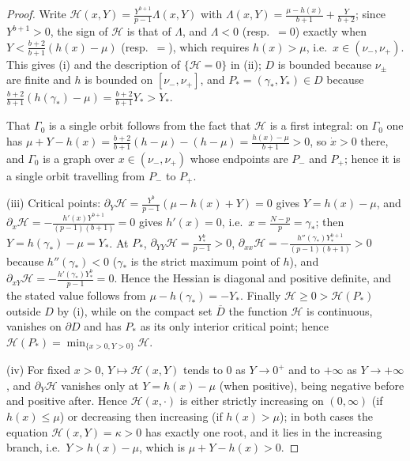 \documentclass[11pt,reqno]{amsart}
\numberwithin{equation}{section}
\theoremstyle{plain}
\theoremstyle{definition}
\newcommand{\gs}{\gamma_{*}}
\begin{document}
\begin{proof}
Write $\mathcal H(x,Y)=\frac{Y^{b+1}}{p-1}\Lambda(x,Y)$ with
$\Lambda(x,Y)=\frac{\mu-h(x)}{b+1}+\frac{Y}{b+2}$; since $Y^{b+1}>0$, the sign
of $\mathcal H$ is that of $\Lambda$, and $\Lambda<0$ (resp.\ $=0$) exactly when
$Y<\frac{b+2}{b+1}(h(x)-\mu)$ (resp.\ $=$), which requires $h(x)>\mu$, i.e.\
$x\in(\nu_{-},\nu_{+})$. This gives (i) and the description of
$\{\mathcal H=0\}$ in (ii); $D$ is bounded because $\nu_{\pm}$ are finite and
$h$ is bounded on $[\nu_{-},\nu_{+}]$, and $P_{*}=(\gs,Y_{*})\in D$ because
$\frac{b+2}{b+1}(h(\gs)-\mu)=\frac{b+2}{b+1}Y_{*}>Y_{*}$.

That $\Gamma_{0}$ is a single orbit follows from the fact that $\mathcal H$ is a
first integral: on $\Gamma_{0}$ one has
$\mu+Y-h(x)=\frac{b+2}{b+1}(h-\mu)-(h-\mu)=\frac{h(x)-\mu}{b+1}>0$, so
$\dot x>0$ there, and $\Gamma_{0}$ is a graph over $x\in(\nu_{-},\nu_{+})$ whose
endpoints are $P_{-}$ and $P_{+}$; hence it is a single orbit travelling from
$P_{-}$ to $P_{+}$.

(iii) Critical points: $\partial_{Y}\mathcal H=\frac{Y^{b}}{p-1}(\mu-h(x)+Y)=0$
gives $Y=h(x)-\mu$, and
$\partial_{x}\mathcal H=-\frac{h'(x)Y^{b+1}}{(p-1)(b+1)}=0$ gives $h'(x)=0$,
i.e.\ $x=\frac{N-p}{p}=\gs$; then $Y=h(\gs)-\mu=Y_{*}$. At $P_{*}$,
$\partial_{YY}\mathcal H=\frac{Y_{*}^{b}}{p-1}>0$,
$\partial_{xx}\mathcal H=-\frac{h''(\gs)Y_{*}^{b+1}}{(p-1)(b+1)}>0$ because
$h''(\gs)<0$ ($\gs$ is the strict maximum point of $h$), and
$\partial_{xY}\mathcal H=-\frac{h'(\gs)Y_{*}^{b}}{p-1}=0$. Hence the Hessian is
diagonal and positive definite, and the stated value follows from
$\mu-h(\gs)=-Y_{*}$. Finally $\mathcal H\ge0>\mathcal H(P_{*})$ outside $D$ by
(i), while on the compact set $\overline D$ the function $\mathcal H$ is
continuous, vanishes on $\partial D$ and has $P_{*}$ as its only interior
critical point; hence $\mathcal H(P_{*})=\min_{\{x>0,Y>0\}}\mathcal H$.

(iv) For fixed $x>0$, $Y\mapsto\mathcal H(x,Y)$ tends to $0$ as $Y\to0^{+}$ and
to $+\infty$ as $Y\to+\infty$, and $\partial_{Y}\mathcal H$ vanishes only at
$Y=h(x)-\mu$ (when positive), being negative before and positive after. Hence
$\mathcal H(x,\cdot)$ is either strictly increasing on $(0,\infty)$ (if
$h(x)\le\mu$) or decreasing then increasing (if $h(x)>\mu$); in both cases the
equation $\mathcal H(x,Y)=\kappa>0$ has exactly one root, and it lies in the
increasing branch, i.e.\ $Y>h(x)-\mu$, which is $\mu+Y-h(x)>0$.
\end{proof}
\end{document}
